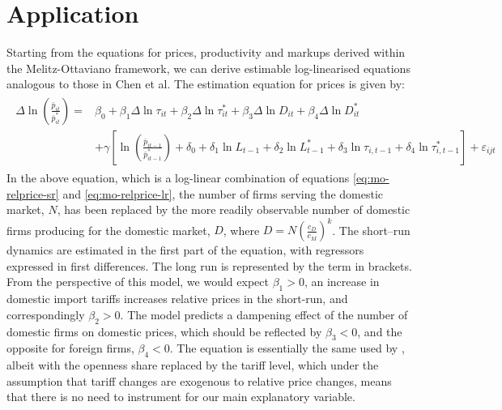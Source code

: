 \section{Application}\label{sec:app}
Starting from the equations for prices, productivity and markups derived within the Melitz-Ottaviano framework, we can derive estimable log-linearised equations analogous to those in Chen et al. The estimation equation for prices is given by:
\begin{align}
\begin{split}\label{eq:gw-estimation-prices}
\Delta \ln \left( \frac{\bar{p}_{it}}{\bar{p}_{it}^*} \right) = &\beta_0 + \beta_1 \Delta \ln \tau_{it} + \beta_2 \Delta \ln \tau_{it}^* + \beta_3 \Delta \ln D_{it} + \beta_4 \Delta \ln D_{it}^* \\ &+ \gamma \left[ \ln \left( \frac{\bar{p}_{it-1}}{\bar{p}_{it-1}^*} \right) + \delta_0 + \delta_1 \ln L_{t-1} + \delta_2\ln L_{t-1}^* + \delta_3 \ln  \tau_{i,t-1} + \delta_4 \ln  \tau_{i,t-1}^* \right] + \varepsilon_{ijt} 
\end{split}\end{align}
In the above equation, which is a log-linear combination of equations \ref{eq:mo-relprice-sr} and \ref{eq:mo-relprice-lr}, the number of firms serving the domestic market, $N$, has been replaced by the more readily observable number of domestic firms producing for the domestic market, $D$, where $D=N \left( \frac{c_D}{c_M} \right)^k$. The short--run dynamics are estimated in the first part of the equation, with regressors expressed in first differences. The long run is represented by the term in brackets. From the perspective of this model, we would expect $\beta_1>0$, an increase in domestic import tariffs increases relative prices in the short-run, and correspondingly $\beta_2>0$. The model predicts a dampening effect of the number of domestic firms on domestic prices, which should be reflected by $\beta_3<0$, and the opposite for foreign firms, $\beta_4<0$. The equation is essentially the same used by \citet{Chen2009}, albeit with the openness share replaced by the tariff level, which under the assumption that tariff changes are exogenous to relative price changes, means that there is no need to instrument for our main explanatory variable.

